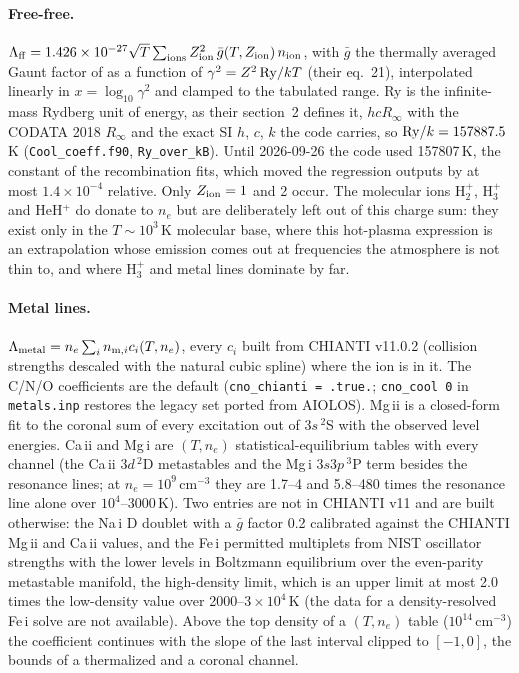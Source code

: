 \paragraph{Free-free.} $\Lambda_{\rm ff} = 1.426\times10^{-27}\sqrt{T}
\sum_{\rm ions} Z_{\rm ion}^{2}\,\bar g(T,Z_{\rm ion})\,n_{\rm ion}$, with
$\bar g$ the thermally averaged Gaunt factor of \citet{vanHoof2014} as a
function of $\gamma^2 = Z^2\,{\rm Ry}/kT$ (their eq.~21), interpolated
linearly in $x = \log_{10}\gamma^2$ and clamped to the tabulated range.  Ry
is the infinite-mass Rydberg unit of energy, as their section~2 defines it,
$hcR_\infty$ with the CODATA 2018 $R_\infty$ and the exact SI $h$, $c$, $k$
the code carries, so ${\rm Ry}/k = 157887.5$\,K (\texttt{Cool\_coeff.f90},
\texttt{Ry\_over\_kB}).  Until 2026-09-26 the code used 157807\,K, the constant
of the \citet{Hui1997} recombination fits, which moved the regression
outputs by at most $1.4\times10^{-4}$ relative. Only $Z_{\rm ion}=1$ and 2 occur.
The molecular ions H$_2^+$, H$_3^+$ and HeH$^+$ do donate to $n_e$ but are
deliberately left out of this charge sum: they exist only in the
$T\sim10^{3}$\,K molecular base, where this hot-plasma expression is an
extrapolation whose emission comes out at frequencies the atmosphere is not
thin to, and where H$_3^+$ and metal lines dominate by far.

\paragraph{Metal lines.} $\Lambda_{\rm metal} = n_e\sum_i n_{{\rm m},i}
c_i(T, n_e)$, every $c_i$ built from CHIANTI v11.0.2 (collision strengths
descaled with the natural cubic spline) where the ion is in it. The C/N/O
coefficients are the default (\texttt{cno\_chianti = .true.};
\texttt{cno\_cool 0} in \texttt{metals.inp} restores the legacy set ported
from AIOLOS). Mg\,{\sc ii} is a closed-form fit to the coronal sum of every
excitation out of $3s\,^2$S with the observed level energies. Ca\,{\sc ii}
and Mg\,{\sc i} are $(T,n_e)$ statistical-equilibrium tables with every
channel (the Ca\,{\sc ii} $3d\,^2$D metastables and the Mg\,{\sc i} $3s3p\,^3$P
term besides the resonance lines; at $n_e=10^{9}$\,cm$^{-3}$ they are
1.7--4 and 5.8--480 times the resonance line alone over
$10^4$--3000\,K). Two entries are not in CHIANTI v11 and are built
otherwise: the Na\,{\sc i} D doublet with a $\bar g$ factor 0.2 calibrated
against the CHIANTI Mg\,{\sc ii} and Ca\,{\sc ii} values, and the
Fe\,{\sc i} permitted multiplets from NIST oscillator strengths with the
lower levels in Boltzmann equilibrium over the even-parity metastable
manifold, the high-density limit, which is an upper limit at most 2.0 times
the low-density value over 2000--$3\times10^4$\,K (the data for a
density-resolved Fe\,{\sc i} solve are not available). Above the top
density of a $(T,n_e)$ table ($10^{14}$\,cm$^{-3}$) the coefficient
continues with the slope of the last interval clipped to $[-1,0]$, the
bounds of a thermalized and a coronal channel.

